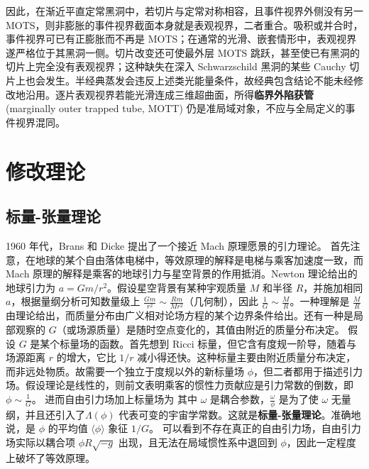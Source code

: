 因此，在渐近平直定常黑洞中，若切片与定常对称相容，且事件视界外侧没有另一 MOTS，则非膨胀的事件视界截面本身就是表观视界，二者重合。吸积或并合时，事件视界可已有正膨胀而不再是 MOTS；在通常的光滑、嵌套情形中，表观视界遂严格位于其黑洞一侧。切片改变还可使最外层 MOTS 跳跃，甚至使已有黑洞的切片上完全没有表观视界；这种缺失在深入 Schwarzschild 黑洞的某些 Cauchy 切片上也会发生。半经典蒸发会违反上述类光能量条件，故经典包含结论不能未经修改地沿用。逐片表观视界若能光滑连成三维超曲面，所得\textbf{临界外陷获管}(marginally outer trapped tube, MOTT) 仍是准局域对象，不应与全局定义的事件视界混同。

\section{修改理论}

\subsection{标量-张量理论}\label{sec:scalar}

1960 年代，Brans 和 Dicke\cite{Brans-Dicke} 提出了一个接近 Mach 原理愿景的引力理论。
首先注意，在地球的某个自由落体电梯中，等效原理的解释是电梯与乘客加速度一致，而 Mach 原理的解释是乘客的地球引力与星空背景的作用抵消。Newton 理论给出的地球引力为 $a=Gm/r^2$。假设星空背景有某种宇观质量 $M$ 和半径 $R$，并施加相同 $a$，根据量纲分析可知数量级上 $\frac{Gm}{r^2}\sim \frac{Rm}{Mr^2}$（几何制），因此 $\frac{1}{G}\sim\frac{M}{R}$。一种理解是 $\frac{M}{R}$ 由理论给出，而质量分布由广义相对论场方程的某个边界条件给出。还有一种是局部观察的 $G$（或场源质量）是随时空点变化的，其值由附近的质量分布决定。
假设 $G$ 是某个标量场的函数。首先想到 Ricci 标量，但它含有度规一阶导，随着与场源距离 $r$ 的增大，它比 $1/r$ 减小得还快。这种标量主要由附近质量分布决定，而非远处物质。故需要一个独立于度规以外的新标量场 $\phi$，但二者都用于描述引力场。假设理论是线性的，则前文表明乘客的惯性力贡献应是引力常数的倒数，即 $\phi\sim\frac{1}{G}$。
进而自由引力场加上标量场为
其中 $\omega$ 是耦合参数，$\frac{\omega}{\phi}$ 是为了使 $\omega$ 无量纲，并且还引入了$\Lambda(\phi)$ 代表可变的宇宙学常数。这就是\textbf{标量-张量理论}。准确地说，是
$\phi$ 的平均值 $\langle\phi\rangle$ 象征 $1/G$。
可以看到不存在真正的自由引力场，自由引力场实际以耦合项 $\phi R\sqrt{-g}$ 出现，且无法在局域惯性系中退回到 $\phi$，因此一定程度上破坏了等效原理。

